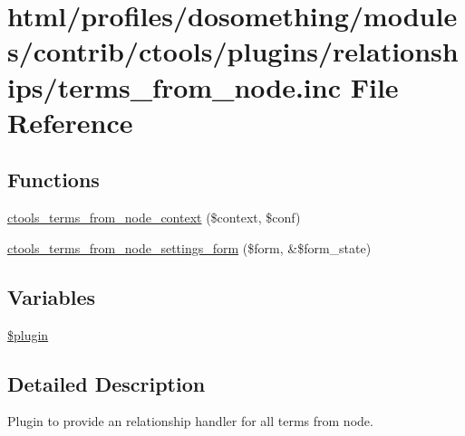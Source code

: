 \hypertarget{terms__from__node_8inc}{
\section{html/profiles/dosomething/modules/contrib/ctools/plugins/relationships/terms\_\-from\_\-node.inc File Reference}
\label{terms__from__node_8inc}
}
\subsection*{Functions}
\begin{DoxyCompactItemize}
\item 
\hyperlink{terms__from__node_8inc_a16cd498426fdaade5d956722e1d2b8bc}{ctools\_\-terms\_\-from\_\-node\_\-context} (\$context, \$conf)
\item 
\hyperlink{terms__from__node_8inc_aaa1332803d1e2198d1bc147d84038734}{ctools\_\-terms\_\-from\_\-node\_\-settings\_\-form} (\$form, \&\$form\_\-state)
\end{DoxyCompactItemize}
\subsection*{Variables}
\begin{DoxyCompactItemize}
\item 
\hyperlink{terms__from__node_8inc_ada8a7130088351710bb02ed622d6bf65}{\$plugin}
\end{DoxyCompactItemize}


\subsection{Detailed Description}
Plugin to provide an relationship handler for all terms from node. 

